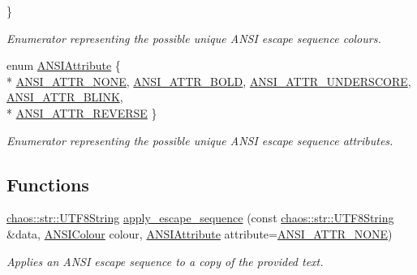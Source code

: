 \begin{DoxyCompactItemize}
 \}
\begin{DoxyCompactList}\small\item\em Enumerator representing the possible unique A\-N\-S\-I escape sequence colours. \end{DoxyCompactList}\item 
enum \hyperlink{namespacechaos_1_1io_1_1format_af01119682ec0bc616b49641e0c2a7ccf}{A\-N\-S\-I\-Attribute} \{ \\*
\hyperlink{namespacechaos_1_1io_1_1format_af01119682ec0bc616b49641e0c2a7ccfa3154b286513beb167bb516ea15f1cfb5}{A\-N\-S\-I\-\_\-\-A\-T\-T\-R\-\_\-\-N\-O\-N\-E}, 
\hyperlink{namespacechaos_1_1io_1_1format_af01119682ec0bc616b49641e0c2a7ccfaada31e77e1e80ea78e0cd08a126271b3}{A\-N\-S\-I\-\_\-\-A\-T\-T\-R\-\_\-\-B\-O\-L\-D}, 
\hyperlink{namespacechaos_1_1io_1_1format_af01119682ec0bc616b49641e0c2a7ccfa2f1d142ccf489cba5710445abd48555f}{A\-N\-S\-I\-\_\-\-A\-T\-T\-R\-\_\-\-U\-N\-D\-E\-R\-S\-C\-O\-R\-E}, 
\hyperlink{namespacechaos_1_1io_1_1format_af01119682ec0bc616b49641e0c2a7ccfacd3671458d96396a0fec66c993244186}{A\-N\-S\-I\-\_\-\-A\-T\-T\-R\-\_\-\-B\-L\-I\-N\-K}, 
\\*
\hyperlink{namespacechaos_1_1io_1_1format_af01119682ec0bc616b49641e0c2a7ccfaa7b58f4c0365d47d2bc98a4587521806}{A\-N\-S\-I\-\_\-\-A\-T\-T\-R\-\_\-\-R\-E\-V\-E\-R\-S\-E}
 \}
\begin{DoxyCompactList}\small\item\em Enumerator representing the possible unique A\-N\-S\-I escape sequence attributes. \end{DoxyCompactList}\end{DoxyCompactItemize}
\subsection*{Functions}
\begin{DoxyCompactItemize}
\item 
\hyperlink{classchaos_1_1str_1_1_u_t_f8_string}{chaos\-::str\-::\-U\-T\-F8\-String} \hyperlink{namespacechaos_1_1io_1_1format_a871d44e1a80db8868e27527793abe025}{apply\-\_\-escape\-\_\-sequence} (const \hyperlink{classchaos_1_1str_1_1_u_t_f8_string}{chaos\-::str\-::\-U\-T\-F8\-String} \&data, \hyperlink{namespacechaos_1_1io_1_1format_aa30dcff2478ffc94e33504c8886a5b1a}{A\-N\-S\-I\-Colour} colour, \hyperlink{namespacechaos_1_1io_1_1format_af01119682ec0bc616b49641e0c2a7ccf}{A\-N\-S\-I\-Attribute} attribute=\hyperlink{namespacechaos_1_1io_1_1format_af01119682ec0bc616b49641e0c2a7ccfa3154b286513beb167bb516ea15f1cfb5}{A\-N\-S\-I\-\_\-\-A\-T\-T\-R\-\_\-\-N\-O\-N\-E})
\begin{DoxyCompactList}\small\item\em Applies an A\-N\-S\-I escape sequence to a copy of the provided text. \end{DoxyCompactList}\end{DoxyCompactItemize}


